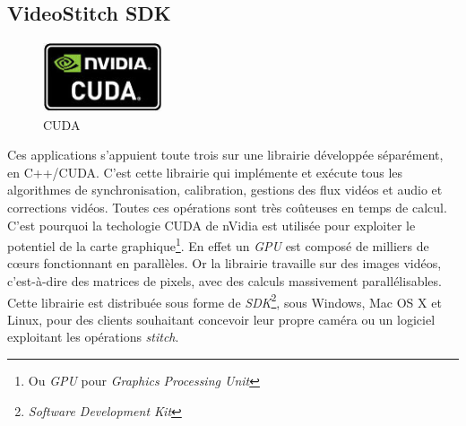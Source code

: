 \subsection{VideoStitch SDK}
\label{videostitch-sdk-section}
\begin{figure}
  \centering
  \includegraphics[width=3.5cm]{images/cuda-logo.jpg}
  \caption{CUDA}
\end{figure}
Ces applications s'appuient toute trois sur une librairie développée séparément,
en C++/CUDA. C'est cette librairie qui implémente et exécute tous les algorithmes
de synchronisation, calibration, gestions des flux vidéos et audio et corrections
vidéos.
Toutes ces opérations sont très coûteuses en temps de calcul. C'est pourquoi
la techologie CUDA de nVidia est utilisée pour exploiter le potentiel de la carte
graphique\footnote{Ou \textit{GPU} pour \textit{Graphics Processing Unit}}. 
En effet un \textit{GPU} est composé de milliers de c\oe urs fonctionnant en parallèles.
Or la librairie travaille sur des images vidéos, c'est-à-dire des matrices de pixels,
avec des calculs massivement parallélisables\cite{videostitch-cuda}.\\
\newline
Cette librairie est distribuée sous forme de \textit{SDK}\footnote{\textit{Software Development Kit}}, sous Windows, Mac OS X et Linux, 
pour des clients souhaitant concevoir leur propre caméra ou un logiciel exploitant
les opérations \textit{stitch}.

